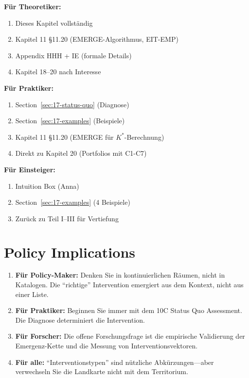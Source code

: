 \begin{tcolorbox}[colback=gray!5!white, colframe=gray!75!black,
    title=Empfohlene Lesepfade]

\textbf{F\"{u}r Theoretiker:}
\begin{enumerate}[nosep]
\item Dieses Kapitel vollst\"{a}ndig
\item Kapitel 11 §11.20 (EMERGE-Algorithmus, EIT-EMP)
\item Appendix HHH + IE (formale Details)
\item Kapitel 18--20 nach Interesse
\end{enumerate}

\textbf{F\"{u}r Praktiker:}
\begin{enumerate}[nosep]
\item Section~\ref{sec:17-status-quo} (Diagnose)
\item Section~\ref{sec:17-examples} (Beispiele)
\item Kapitel 11 §11.20 (EMERGE für $K^*$-Berechnung)
\item Direkt zu Kapitel 20 (Portfolios mit C1-C7)
\end{enumerate}

\textbf{F\"{u}r Einsteiger:}
\begin{enumerate}[nosep]
\item Intuition Box (Anna)
\item Section~\ref{sec:17-examples} (4 Beispiele)
\item Zur\"{u}ck zu Teil I--III f\"{u}r Vertiefung
\end{enumerate}

\end{tcolorbox}



\section*{Policy Implications}

\begin{enumerate}
\item \textbf{F\"{u}r Policy-Maker:} Denken Sie in kontinuierlichen R\"{a}umen, nicht in Katalogen. Die ``richtige'' Intervention emergiert aus dem Kontext, nicht aus einer Liste.

\item \textbf{F\"{u}r Praktiker:} Beginnen Sie immer mit dem 10C Status Quo Assessment. Die Diagnose determiniert die Intervention.

\item \textbf{F\"{u}r Forscher:} Die offene Forschungsfrage ist die empirische Validierung der Emergenz-Kette und die Messung von Interventionsvektoren.

\item \textbf{F\"{u}r alle:} ``Interventionstypen'' sind n\"{u}tzliche Abk\"{u}rzungen---aber verwechseln Sie die Landkarte nicht mit dem Territorium.
\end{enumerate}


